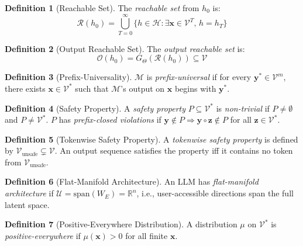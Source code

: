 \documentclass[11pt]{article}
\theoremstyle{definition}
\newtheorem{definition}{Definition}[section]
\theoremstyle{remark}
\begin{document}
\begin{definition}[Reachable Set]
The \emph{reachable set} from $h_0$ is:
\begin{equation}
\mathcal{R}(h_0) = \bigcup_{T=0}^{\infty} \{h \in \mathcal{H} : \exists \mathbf{x} \in \mathcal{V}^T,\, h = h_T\}
\end{equation}
\end{definition}

\begin{definition}[Output Reachable Set]
The \emph{output reachable set} is:
\begin{equation}
\mathcal{O}(h_0) = G_\Theta(\mathcal{R}(h_0)) \subseteq \mathcal{V}
\end{equation}
\end{definition}

\begin{definition}[Prefix-Universality]
$\mathcal{M}$ is \emph{prefix-universal} if for every $\mathbf{y}^* \in \mathcal{V}^m$, there exists $\mathbf{x} \in \mathcal{V}^*$ such that $\mathcal{M}$'s output on $\mathbf{x}$ begins with $\mathbf{y}^*$.
\end{definition}

\begin{definition}[Safety Property]
A \emph{safety property} $P \subseteq \mathcal{V}^*$ is \emph{non-trivial} if $P \neq \emptyset$ and $P \neq \mathcal{V}^*$. $P$ has \emph{prefix-closed violations} if $\mathbf{y} \notin P \Rightarrow \mathbf{y} \circ \mathbf{z} \notin P$ for all $\mathbf{z} \in \mathcal{V}^*$.
\end{definition}

\begin{definition}[Tokenwise Safety Property]
A \emph{tokenwise safety property} is defined by $\mathcal{V}_{\text{unsafe}} \subsetneq \mathcal{V}$. An output sequence satisfies the property iff it contains no token from $\mathcal{V}_{\text{unsafe}}$.
\end{definition}

\begin{definition}[Flat-Manifold Architecture]
An LLM has \emph{flat-manifold architecture} if $\mathcal{U} = \mathrm{span}(W_E) = \mathbb{R}^n$, i.e., user-accessible directions span the full latent space.
\end{definition}

\begin{definition}[Positive-Everywhere Distribution]
A distribution $\mu$ on $\mathcal{V}^*$ is \emph{positive-everywhere} if $\mu(\mathbf{x}) > 0$ for all finite $\mathbf{x}$.
\end{definition}
\end{document}
